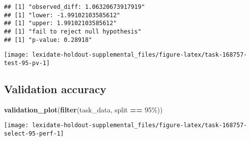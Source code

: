 \documentclass[
]{book}
\newenvironment{Shaded}{\begin{snugshade}}{\end{snugshade}}
\newcommand{\AttributeTok}[1]{\textcolor[rgb]{0.13,0.29,0.53}{#1}}
\newcommand{\DecValTok}[1]{\textcolor[rgb]{0.00,0.00,0.81}{#1}}
\newcommand{\FunctionTok}[1]{\textcolor[rgb]{0.13,0.29,0.53}{\textbf{#1}}}
\newcommand{\NormalTok}[1]{#1}
\newcommand{\OtherTok}[1]{\textcolor[rgb]{0.56,0.35,0.01}{#1}}
\newcommand{\SpecialCharTok}[1]{\textcolor[rgb]{0.81,0.36,0.00}{\textbf{#1}}}
\newcommand{\StringTok}[1]{\textcolor[rgb]{0.31,0.60,0.02}{#1}}
\begin{document}
\begin{Shaded}
\end{Shaded}

\begin{verbatim}
## [1] "observed_diff: 1.06320673917919"
## [1] "lower: -1.99102103585612"
## [1] "upper: 1.99102103585612"
## [1] "fail to reject null hypothesis"
## [1] "p-value: 0.28918"
\end{verbatim}

\texttt{[image: lexidate-holdout-supplemental\_files/figure-latex/task-168757-test-95-pv-1]}

\hypertarget{validation-accuracy-24}{%
\subsection{Validation accuracy}\label{validation-accuracy-24}}

\begin{Shaded}
\begin{Highlighting}[]
\FunctionTok{validation\_plot}\NormalTok{(}\FunctionTok{filter}\NormalTok{(task\_data, split }\SpecialCharTok{==} \StringTok{\textquotesingle{}95\%\textquotesingle{}}\NormalTok{))}
\end{Highlighting}
\end{Shaded}

\texttt{[image: lexidate-holdout-supplemental\_files/figure-latex/task-168757-select-95-perf-1]}
\end{document}
